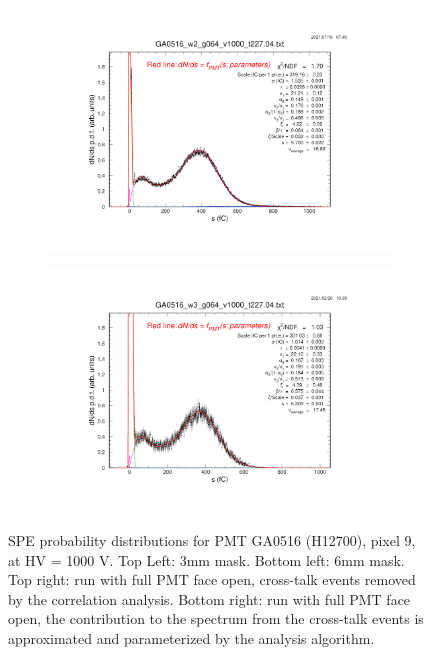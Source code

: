 \begin{figure}[b]
	\begin{subfigure}[c]{0.42\linewidth}
		\centering
		\includegraphics[width=\linewidth, trim={6cm 6cm 75mm 85mm},clip]{figures/pavel_temp/GA0516_w2_g064_v1000_6mm.04.png}
		\vspace{0mm}
	\end{subfigure}%
	\begin{subfigure}[c]{0.42\linewidth}
		\centering
		\includegraphics[width=\linewidth, trim={75mm 6cm 6cm 85mm},clip]{figures/pavel_temp/GA0516_w3_g064_v1000_raw.04.png}
		\vspace{0mm}
	\end{subfigure}%
	\caption{SPE probability distributions for PMT GA0516 (H12700), pixel 9, at HV = 1000 V. Top Left: 3mm mask. Bottom left: 6mm mask. Top right: run with full PMT face open, cross-talk events removed by the correlation analysis. Bottom right: run with full PMT face open, the contribution to the spectrum from the cross-talk events is approximated and parameterized by the analysis algorithm.}
	\label{fig:GA0516_fits}
\end{figure}



